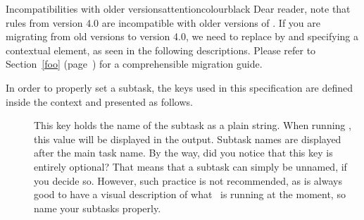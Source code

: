 \begin{description}
\begin{messagebox}{Incompatibilities with older versions}{attentioncolour}{\icerror}{black}
Dear reader, note that rules from version 4.0 are incompatible with older versions of \arara. If you are migrating from old versions to version 4.0, we need to replace  by  and specifying a contextual element, as seen in the following descriptions. Please refer to Section~\ref{foo} (page~\pageref{foo}) for a comprehensible migration guide.
\end{messagebox}

In order to properly set a subtask, the keys used in this specification are defined inside the  context and presented as follows.

\begin{description}
\item[] This key holds the name of the subtask as a plain string. When running \arara, this value will be displayed in the output. Subtask names are displayed after the main task name. By the way, did you notice that this key is entirely optional? That means that a subtask can simply be unnamed, if you decide so. However, such practice is not recommended, as is always good to have a visual description of what \arara\ is running at the moment, so name your subtasks properly.

\item[] 
\end{description}
\end{description}

%
%

